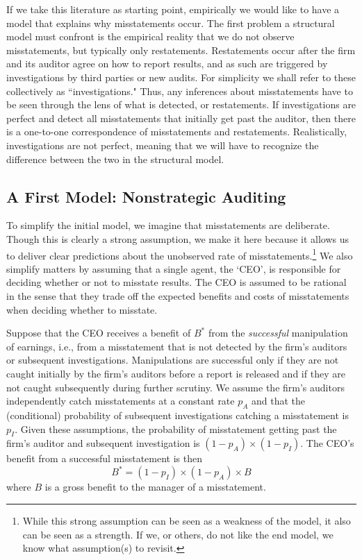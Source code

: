 If we take this literature as starting point, empirically we would like to have a model that explains why misstatements occur. 
The first problem a structural model must confront is the empirical reality that we do not observe misstatements, but typically only restatements. 
Restatements occur after the firm and its auditor agree on how to report results, and as such are triggered by investigations by third parties or new 
audits.
For simplicity we shall refer to these collectively as ``investigations." 
Thus, any inferences about misstatements have to be seen through the lens of what is detected, or restatements.
If investigations are perfect and detect all misstatements that initially get past the auditor, then there is a one-to-one correspondence of misstatements and restatements. 
Realistically, investigations are not perfect, meaning that we will have to recognize the difference between the two in the structural model.

\subsection{A First Model: Nonstrategic Auditing}

To simplify the initial model, we imagine that misstatements  are
deliberate. 
Though this is clearly a strong assumption, we make it here because it 
allows us to deliver clear predictions about the unobserved rate of misstatements.\footnote{
While this strong assumption can be seen as a weakness of the model, it also can be
seen as a strength. 
If we, or others, do not like the end model, we know what assumption(s)
to revisit.} 
We also simplify matters by assuming that a single agent, the `CEO', is responsible for deciding whether or not to misstate results.
The CEO is assumed to be rational in the sense that they trade off the expected benefits and costs of misstatements when deciding whether to misstate.

Suppose that the CEO receives a benefit of $B^*$ from the \emph{successful} manipulation of earnings, 
i.e., from a misstatement that is not detected by the firm's auditors or subsequent investigations. 
Manipulations are successful only if they are not caught initially by the firm's auditors before a report is released and if they are not caught subsequently during further scrutiny.
We assume the firm's auditors independently catch misstatements at a constant rate $p_A$ and that the (conditional) probability of subsequent investigations catching a misstatement is $p_I$.
Given these assumptions, the probability of misstatement getting past the firm's 
auditor and subsequent investigation is $(1-p_A) \times (1 - p_I)$.
The CEO's benefit from a successful misstatement is then
$$ B^* = (1-p_I) \times (1-p_A) \times B$$
where $B$ is a gross benefit to the manager of a misstatement. 

